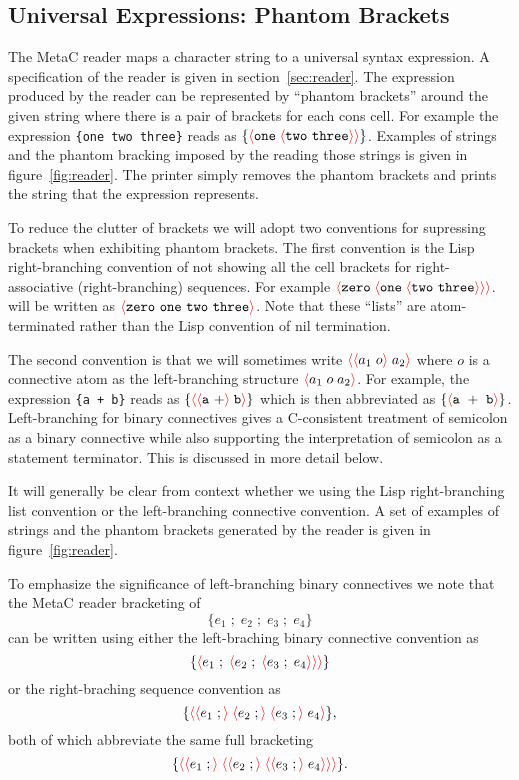 \documentclass{article}
\newcommand{\mtt}[1]{\mbox{\tt #1}}
\newcommand{\fopen}{{\color{red} \langle}}
\newcommand{\fclose}{{\color{red} \rangle}}
\begin{document}
\subsection{Universal Expressions: Phantom Brackets}

The MetaC reader maps a character string to a universal syntax expression.  A specification of the reader is given in section~\ref{sec:reader}.
The expression produced by the reader
can be represented by ``phantom brackets'' around the given string
where there is a pair of brackets for each cons cell.
For example the expression \mtt{\{one two three\}} reads as $\{\fopen \mathtt{one}\;\fopen \mathtt{two~three}\fclose \fclose\}$.
Examples of strings and the phantom bracking imposed by the reading those strings is given in figure~{\ref{fig:reader}}.
The printer simply removes the phantom brackets and prints the string that the expression represents.

To reduce the clutter of brackets we will adopt two conventions for supressing brackets when exhibiting phantom brackets.
The first convention is the Lisp right-branching convention of not showing all the cell brackets for right-associative (right-branching) sequences.
For example $\fopen \mathtt{zero}\;\fopen \mathtt{one}\;\fopen \mathtt{two~three}\fclose \fclose \fclose$.
will be written as $\fopen\mathtt{zero~one~two~three}\fclose$.  Note that these ``lists'' are atom-terminated rather than the Lisp convention of
nil termination.

The second convention is that we will sometimes write $\fopen \fopen a_1 \;o\fclose\;a_2\fclose$ where $o$ is a connective atom
as the left-branching structure $\fopen a_1\;o\;a_2 \fclose$.  For example, the expression \mtt{\{a + b\}} reads as
$\{\fopen \fopen \mathtt{a~+} \fclose \;\mathtt{b} \fclose \}$ which is then abbreviated as
$\{\fopen \mathtt{a~+~b} \fclose \}$.  Left-branching for binary connectives gives a
C-consistent treatment of semicolon as a binary connective while also supporting the interpretation of semicolon as a statement terminator.
This is discussed in more detail below.

It will generally be clear from context whether we using the Lisp right-branching list convention
or the left-branching connective convention.
A set of examples of strings and the phantom brackets generated by the reader is given in figure~\ref{fig:reader}.


To emphasize the significance of left-branching binary connectives we note that
the MetaC reader bracketing of
$$\{e_1\;;\;e_2\;;\;e_3\;;\;e_4\}$$
can be written using either the left-braching binary connective convention as
$$\{\fopen e_1\;;\;\fopen e_2\;;\;\fopen e_3\;;\;e_4\fclose\fclose\fclose\}$$
or the right-braching sequence convention as
$$\{\fopen \fopen e_1\;;\fclose \;\fopen e_2\;;\fclose \;\fopen e_3\;;\fclose\;e_4\fclose\},$$
both of which abbreviate the same full bracketing
$$\{\fopen \fopen e_1\;;\fclose \;\fopen \fopen e_2\;;\fclose \;\fopen \fopen e_3\;;\fclose\;e_4\fclose\fclose\fclose\}.$$
\end{document}

